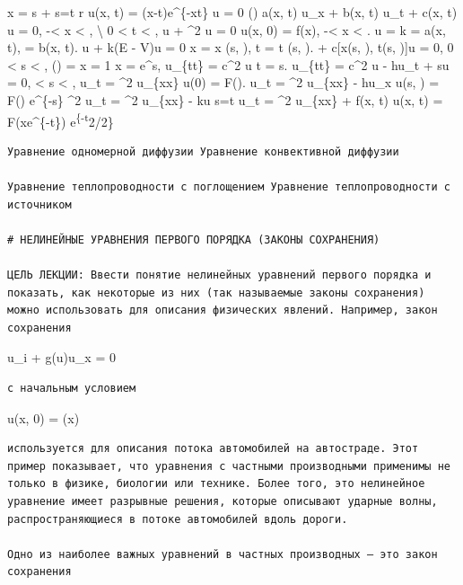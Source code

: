 \documentclass[
  ukrainian,
]{article}
\begin{document}
x = s + \tau s=t r  u(x, t) = \sin(x-t)e\^{}\{-xt\} \Delta u
= 0 (\forall \Pi) \quad a(x, t) u\_x + b(x, t) u\_t + c(x, t) u = 0,
\quad -\infty \textless{} x \textless{} \infty, \textbackslash{} 0
\textless{} t \textless{} \infty, \Delta u + \lambda\^{}2 u = 0 u(x, 0)
= f(x), \quad -\infty \textless{} x \textless{} \infty. \Delta u = k
 = a(x, t), \qquad {} = b(x, t). \Delta u + k(E
- V)u = 0 x = x (s, \tau), t = t (s, \tau).  + c{[}x(s,
\tau), t(s, \tau){]}u = 0, 0 \textless{} s \textless{} \infty,
()  = x  = 1 x = \tau e\^{}s,
u\_\{tt\} = c\^{}2 \Delta u t = s. u\_\{tt\} = c\^{}2 \Delta u - hu\_t
 + su = 0,  \textless{} s \textless{} \infty, u\_t =
\alpha\^{}2 u\_\{xx\} u(0) = F(\tau). u\_t = \alpha\^{}2 u\_\{xx\} -
hu\_x u(s, \tau) = F(\tau) e\^{}\{-s\} \ell\^{}2 u\_t = \alpha\^{}2
u\_\{xx\} - ku s=t u\_t = \alpha\^{}2 u\_\{xx\} + f(x, t) u(x, t) =
F(xe\^{}\{-t\}) e\textsuperscript{\{-t}2/2\}

\begin{verbatim}
Уравнение одномерной диффузии Уравнение конвективной диффузии

Уравнение теплопроводности с поглощением Уравнение теплопроводности с источником

# НЕЛИНЕЙНЫЕ УРАВНЕНИЯ ПЕРВОГО ПОРЯДКА (ЗАКОНЫ СОХРАНЕНИЯ)

ЦЕЛЬ ЛЕКЦИИ: Ввести понятие нелинейных уравнений первого порядка и показать, как некоторые из них (так называемые законы сохранения) можно использовать для описания физических явлений. Например, закон сохранения
\end{verbatim}

u\_i + g(u)u\_x = 0

\begin{verbatim}
с начальным условием
\end{verbatim}

u(x, 0) = \varphi(x)

\begin{verbatim}
используется для описания потока автомобилей на автостраде. Этот пример показывает, что уравнения с частными производными применимы не только в физике, биологии или технике. Более того, это нелинейное уравнение имеет разрывные решения, которые описывают ударные волны, распространяющиеся в потоке автомобилей вдоль дороги.

Одно из наиболее важных уравнений в частных производных — это закон сохранения
\end{verbatim}
\end{document}
